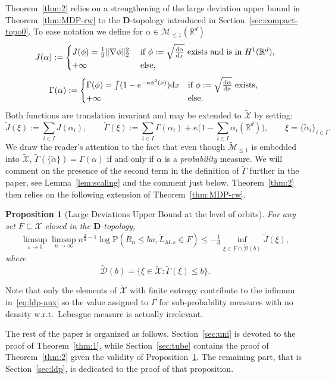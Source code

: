 \documentclass[a4paper,11pt]{amsart}
\numberwithin{equation}{section}
\newtheorem{proposition}[theorem]{Proposition}
\newcommand{\bbR}{{\ensuremath{\mathbb R}} }
\newcommand{\cD}{{\ensuremath{\mathcal D}} }
\newcommand{\cM}{{\ensuremath{\mathcal M}} }
\newcommand{\cX}{{\ensuremath{\mathcal X}} }
\newcommand{\ga}{\alpha}
\newcommand{\gep}{\varepsilon}
\newcommand{\gk}{\kappa}
\newcommand{\bfD}{\mathbf{D}}
\renewcommand{\tilde}{\widetilde}          %
\newcommand{\dd}{\text{\rm d}}             %
\newcommand\bP{\ensuremath{\mathrm{P}}}
\newcommand{\8}{\infty}
\newcommand{\beq}{\begin{equation}}
\newcommand{\eeq}{\end{equation}}
\begin{document}
Theorem~\ref{thm:2} relies on a strengthening of the large deviation upper bound in Theorem~\ref{thm:MDP-rw} to the $\bfD$-topology introduced in Section~\ref{sec:compact-topo0}. To ease notation we define for $\ga\in\cM_{\le 1}(\bbR^d)$
\beq
J(\ga) :=
\begin{cases}
J(\phi) = \frac12 \|\nabla\phi\|_2^2 & \textrm{ if } \phi:= \sqrt{\frac{\dd \ga}{\dd x}} \text{ exists and is in } H^1(\bbR^d),\\
+\infty & \textrm{ else, }
\end{cases}
\eeq
\beq
\Gamma(\ga) := 
\begin{cases}
\Gamma(\phi) = \int (1-e^{-\gk \phi^2(x)})\dd x & \text{if } \phi:= \sqrt{\frac{\dd \ga}{\dd x}} \text{ exists, }\\
+\infty & \text{else.} 
\end{cases}
\eeq
Both functions are translation invariant and may be extended to $\tilde \cX$ by setting:
\beq
\label{eq:def-tilde-JG}
\tilde J(\xi) := \sum_{i\in I} J(\ga_i), \qquad
\tilde\Gamma(\xi) := \sum_{i\in I} \Gamma(\ga_i) + \kappa\Big(1- \sum_{i\in I} \ga_i(\bbR^d) \Big),
\qquad \xi =\{\tilde\ga_i\}_{i\in I}.
\eeq
We draw the reader's attention to the fact that even though $\tilde \cM_{\le 1}$ is embedded into $\tilde \cX$, $\tilde \Gamma(\{\tilde \ga\}) = \Gamma(\ga)$ if and only if $\ga$ is a {\it probability} measure. We will comment on the presence of the second term in the definition of $\tilde \Gamma$ further in the paper, see Lemma~\ref{lem:scaling} and the comment just below.
Theorem~\ref{thm:2} then relies on the following extension of Theorem~\ref{thm:MDP-rw}.
%
\begin{proposition}[Large Deviations Upper Bound at the level of orbits]
\label{pr:LDP-measure}
For any set $F\subseteq\tilde\cX$ closed in the $\bfD$-topology,
\beq
\label{eq:ldp-aux}
\limsup_{\gep\to 0} \limsup_{n\to\infty} n^{\frac2d -1}\log \bP(R_n\le bn, \tilde L_{M,\gep} \in F)
\le - { \tfrac 1d}\inf_{\xi \in F \cap \tilde\cD(b)} \tilde J(\xi),
\eeq
where
\beq
\tilde\cD(b) = \Big\{\xi\in\tilde\cX \colon \tilde\Gamma(\xi) \le b\Big\}.
\eeq
\end{proposition}
 Note that only the elements of $\tilde\cX$ with finite entropy contribute to the infimum in~\eqref{eq:ldp-aux} so the value assigned to $\Gamma$ for sub-probability measures with no density w.r.t.\ Lebesgue measure is actually irrelevant.\\

\par The rest of the paper is organized as follows. Section~\ref{sec:uni} is devoted to the proof of Theorem~\ref{thm:1}, while Section~\ref{sec:tube} contains the proof of Theorem~\ref{thm:2} given the validity of Proposition~\ref{pr:LDP-measure}. The remaining part, that is Section~\ref{sec:ldp}, is dedicated to the proof of that proposition.
%
\end{document}
